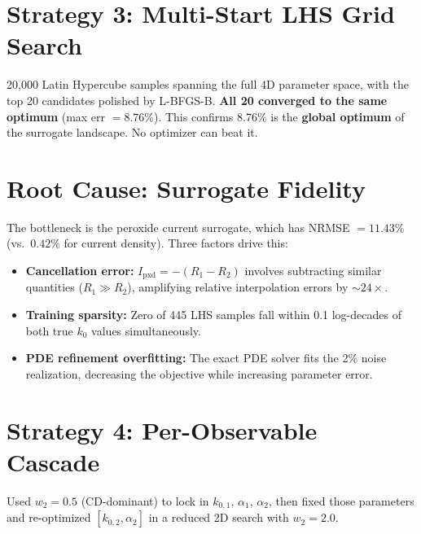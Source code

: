 \documentclass[11pt]{article}
\begin{document}
\section{Strategy 3: Multi-Start LHS Grid Search}

20{,}000 Latin Hypercube samples spanning the full 4D parameter space, with
the top 20 candidates polished by L-BFGS-B.  \textbf{All 20 converged to the
same optimum} (max err $= 8.76\%$).  This confirms 8.76\% is the
\textbf{global optimum} of the surrogate landscape.  No optimizer can beat it.


\section{Root Cause: Surrogate Fidelity}
\label{sec:root_cause}

The bottleneck is the peroxide current surrogate, which has NRMSE $= 11.43\%$
(vs.\ $0.42\%$ for current density).  Three factors drive this:
\begin{itemize}
  \item \textbf{Cancellation error:} $I_{\text{pxd}} = -(R_1 - R_2)$ involves
        subtracting similar quantities ($R_1 \gg R_2$), amplifying relative
        interpolation errors by ${\sim}24\times$.
  \item \textbf{Training sparsity:} Zero of 445 LHS samples fall within 0.1
        log-decades of both true $k_0$ values simultaneously.
  \item \textbf{PDE refinement overfitting:} The exact PDE solver fits the
        2\% noise realization, decreasing the objective while increasing
        parameter error.
\end{itemize}


\section{Strategy 4: Per-Observable Cascade}

Used $w_2 = 0.5$ (CD-dominant) to lock in $k_{0,1}$, $\alpha_1$, $\alpha_2$,
then fixed those parameters and re-optimized $[k_{0,2}, \alpha_2]$ in a
reduced 2D search with $w_2 = 2.0$.
\end{document}
